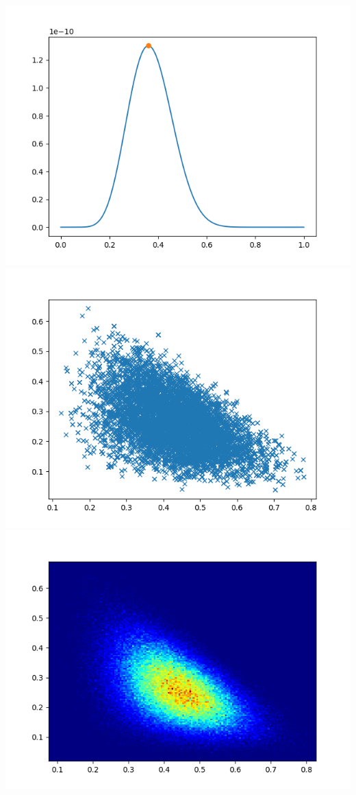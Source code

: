 \documentclass[pt12]{article}
\begin{document}
\newpage

\begin{center}
\includegraphics[scale=0.5]{hip34.png}\\
\includegraphics[scale=0.5]{sc34.png}\\
\includegraphics[scale=0.5]{den34.png}\\
\end{center}
\end{document}
